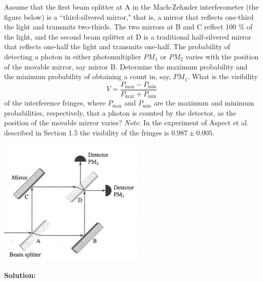 \documentclass[11pt]{article}
\begin{document}
\begin{problem}[Townsend (P1.26)]
Assume that the first beam splitter at A in the Mach-Zehnder interferometer (the figure below) is a ``third-silvered
mirror," that is, a mirror that reflects one-third the light and transmits two-thirds. The two
mirrors at B and C reflect 100 \% of the light, and the second beam splitter at D is a traditional half-silvered
mirror that reflects one-half the light and transmits one-half. The probability of detecting
a photon in either photomultiplier $PM_1$ or $PM_2$ varies with the position of the movable mirror, say
mirror B. Determine the maximum probability and the minimum probability of obtaining a count
in, say, $PM_1$. What is the visibility
\[
	V = \frac{P_{\text{max}} - P_{\text{min}}}{P_{\text{max}} + P_{\text{min}}}
\]	
of the interference fringes, where $P_{\text{max}}$ and $P_{\text{min}}$ are the maximum and minimum probabilities,
respectively, that a photon is counted by the detector, as the position of the movable mirror varies?
\textit{Note}: In the experiment of Aspect et al. described in Section 1.5 the visibility of the fringes is
$0.987 \pm 0.005$.
\begin{center}
\includegraphics[scale=0.6]{prob4.png}
\end{center}
\end{problem}


\textbf{Solution:}\\

\clearpage
\end{document}
